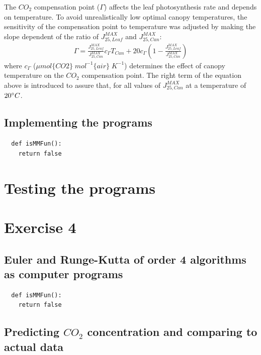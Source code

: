 \documentclass[a4paper]{article}
\begin{document}
The \(CO_2\) compensation point (\(\Gamma\)) affects the leaf photosynthesis rate and depends on temperature. To avoid unrealistically low optimal canopy temperatures, the sensitivity of the compensation point to temperature was adjusted by making the slope dependent of the ratio of \(J^{MAX}_{25,Leaf}\) and \(J^{MAX}_{25,Can}\):
\begin{align}
  \Gamma = \frac{J^{MAX}_{25,Leaf}}{J^{MAX}_{25,Can}}c_{\Gamma} T_{Can} + 20 c_{\Gamma} \left(1-\frac{J^{MAX}_{25,Leaf}}{J^{MAX}_{25,Can}}\right)
\end{align}
where \(c_{\Gamma}\) (\(\mu mol\{CO2\}\;mol^{-1}\{air\}\;K^{-1}\)) determines the effect of canopy temperature on the \(CO_2\) compensation point. The right term of the equation above is introduced to assure that, for all values of \(J^{MAX}_{25,Can}\) at a temperature of \(20 \degree C\).

\subsection{Implementing the programs}
\begin{verbatim}
  def isMMFun():
    return false
\end{verbatim}


\newpage
\section{Testing the programs}


\newpage
\section{Exercise 4}
\subsection{Euler and Runge-Kutta of order 4 algorithms as computer programs}
\begin{verbatim}
  def isMMFun():
    return false
\end{verbatim}

\subsection{Predicting \(CO_2\) concentration and comparing to actual data}


\newpage
\end{document}
